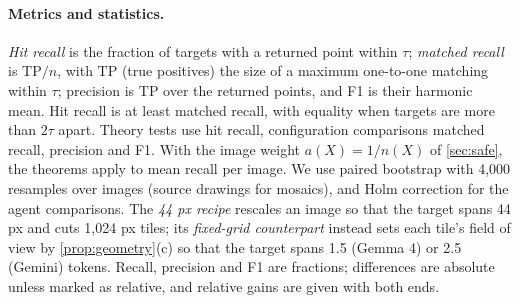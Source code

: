 \paragraph{Metrics and statistics.} \emph{Hit recall} is the fraction of targets with a returned point within $\tau$; \emph{matched recall} is $\mathrm{TP}/n$, with $\mathrm{TP}$ (true positives) the size of a maximum one-to-one matching within $\tau$; precision is $\mathrm{TP}$ over the returned points, and F1 is their harmonic mean. Hit recall is at least matched recall, with equality when targets are more than $2\tau$ apart. Theory tests use hit recall, configuration comparisons matched recall, precision and F1. With the image weight $a(X) = 1/n(X)$ of \cref{sec:safe}, the theorems apply to mean recall per image. We use paired bootstrap with 4{,}000 resamples over images (source drawings for mosaics), and Holm correction for the agent comparisons. The \emph{44 px recipe} rescales an image so that the target spans 44 px and cuts 1{,}024 px tiles; its \emph{fixed-grid counterpart} instead sets each tile's field of view by \cref{prop:geometry}(c) so that the target spans 1.5 (Gemma 4) or 2.5 (Gemini) tokens. Recall, precision and F1 are fractions; differences are absolute unless marked as relative, and relative gains are given with both ends.
